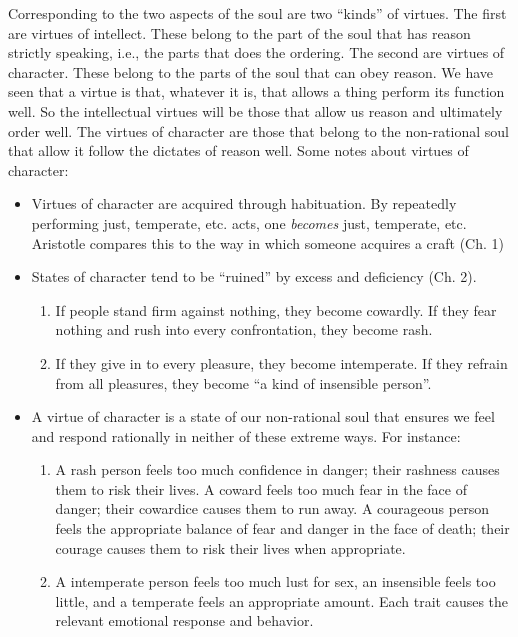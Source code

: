 \documentclass[oneside]{article}
\begin{document}
Corresponding to the two aspects of the soul are two ``kinds'' of virtues. The first are virtues of intellect. These belong to the part of the soul that has reason strictly speaking, i.e., the parts that does the ordering. The second are virtues of character. These belong to the parts of the soul that can obey reason. We have seen that a virtue is that, whatever it is, that allows a thing perform its function well. So the intellectual virtues will be those that allow us reason and ultimately order well. The virtues of character are those that belong to the non-rational soul that allow it follow the dictates of reason well.  Some notes about virtues of character: 
\begin{itemize}
\item Virtues of character are acquired through habituation. By repeatedly performing just, temperate, etc. acts, one \emph{becomes} just, temperate, etc. Aristotle compares this to the way in which someone acquires a craft (Ch. 1)
\item States of character tend to be ``ruined'' by excess and deficiency (Ch. 2).
\begin{enumerate}
\item If people stand firm against nothing, they become cowardly. If they fear nothing and rush into every confrontation, they become rash. 
\item If they give in to every pleasure, they become intemperate. If they refrain from all pleasures, they become ``a kind of insensible person''.
\end{enumerate}
\item A virtue of character is a state of our non-rational soul that ensures we feel and respond rationally in neither of these extreme ways. For instance:  
\begin{enumerate}
\item A rash person feels too much confidence in danger; their rashness causes them to risk their lives. A coward feels too much fear in the face of danger; their cowardice causes them to run away. A courageous person feels the appropriate balance of fear and danger in the face of death; their courage causes them to risk their lives when appropriate.
\item A intemperate person feels too much lust for sex, an insensible feels too little, and a temperate feels an appropriate amount. Each trait causes the relevant emotional response and behavior. 
\end{enumerate}
\end{itemize}
\end{document}
